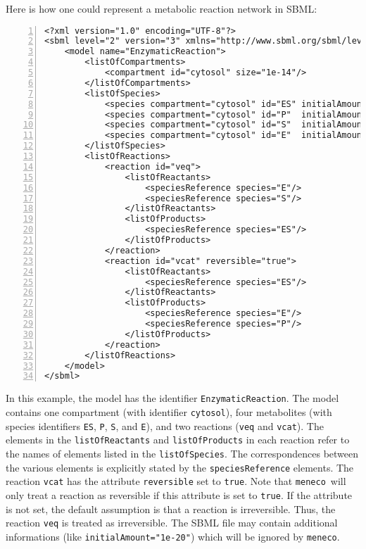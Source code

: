 \documentclass{article}
\newcommand\meneco{\texttt{meneco}}
\begin{document}
Here is how one could represent a metabolic reaction network in SBML:
\begin{Verbatim}[frame=single,numbers=left]
<?xml version="1.0" encoding="UTF-8"?>
<sbml level="2" version="3" xmlns="http://www.sbml.org/sbml/level2/version3">
    <model name="EnzymaticReaction">
        <listOfCompartments>
            <compartment id="cytosol" size="1e-14"/>
        </listOfCompartments>
        <listOfSpecies>
            <species compartment="cytosol" id="ES" initialAmount="0"     name="ES"/>
            <species compartment="cytosol" id="P"  initialAmount="0"     name="P"/>
            <species compartment="cytosol" id="S"  initialAmount="1e-20" name="S"/>
            <species compartment="cytosol" id="E"  initialAmount="5e-21" name="E"/>
        </listOfSpecies>
        <listOfReactions>
            <reaction id="veq">
                <listOfReactants>
                    <speciesReference species="E"/>
                    <speciesReference species="S"/>
                </listOfReactants>
                <listOfProducts>
                    <speciesReference species="ES"/>
                </listOfProducts>
            </reaction>
            <reaction id="vcat" reversible="true">
                <listOfReactants>
                    <speciesReference species="ES"/>
                </listOfReactants>
                <listOfProducts>
                    <speciesReference species="E"/>
                    <speciesReference species="P"/>
                </listOfProducts>
            </reaction>
        </listOfReactions>
    </model>
</sbml>
\end{Verbatim}
In this example, the model has the identifier \texttt{EnzymaticReaction}.
The model contains one compartment (with identifier \texttt{cytosol}),
four metabolites (with species identifiers \texttt{ES}, \texttt{P}, \texttt{S}, and \texttt{E}), and two reactions (\texttt{veq} and \texttt{vcat}).
The elements in the \texttt{listOfReactants} and \texttt{listOfProducts} in each reaction refer to the names of elements listed in the \texttt{listOfSpecies}.
The correspondences between the various elements is explicitly stated by the \texttt{speciesReference} elements.
The reaction \texttt{vcat} has the attribute \texttt{reversible} set to \texttt{true}. 
Note that \meneco\ will only treat a reaction as reversible if this attribute is set to \texttt{true}.
If the attribute is not set, the default assumption is that a reaction is irreversible. 
Thus, the reaction \texttt{veq} is treated as irreversible.
The SBML file may contain additional informations (like \texttt{initialAmount="1e-20"}) which will be ignored by \meneco.
\end{document}
